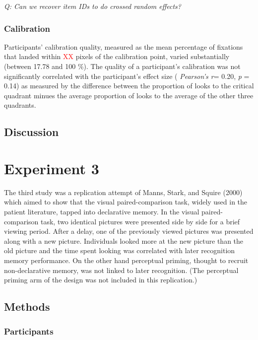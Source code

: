 \documentclass[
  man,floatsintext]{apa6}
\begin{document}
\emph{Q: Can we recover item IDs to do crossed random effects?}

\hypertarget{calibration-1}{%
\subsubsection{Calibration}\label{calibration-1}}

Participants' calibration quality, measured as the mean percentage of fixations that landed within \textcolor{red}{XX} pixels of the calibration point, varied substantially (between 17.78 and 100 \%).
The quality of a participant's calibration was not significantly correlated with the participant's effect size ( \emph{Pearson's r}= 0.20, \emph{p} = 0.14) as measured by the difference between the proportion of looks to the critical quadrant minues the average proportion of looks to the average of the other three quadrants.

\hypertarget{discussion-1}{%
\subsection{Discussion}\label{discussion-1}}

\hypertarget{experiment-3}{%
\section{Experiment 3}\label{experiment-3}}

The third study was a replication attempt of Manns, Stark, and Squire (2000) which aimed to show that the visual paired-comparison task, widely used in the patient literature, tapped into declarative memory. In the visual paired-comparison task, two identical pictures were presented side by side for a brief viewing period. After a delay, one of the previously viewed pictures was presented along with a new picture. Individuals looked more at the new picture than the old picture and the time spent looking was correlated with later recognition memory performance. On the other hand perceptual priming, thought to recruit non-declarative memory, was not linked to later recognition. (The perceptual priming arm of the design was not included in this replication.)

\hypertarget{methods-2}{%
\subsection{Methods}\label{methods-2}}

\hypertarget{participants-3}{%
\subsubsection{Participants}\label{participants-3}}
\end{document}
